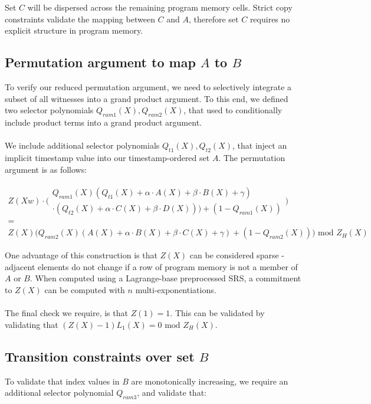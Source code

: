\documentclass[11pt]{article} %
\begin{document}
Set $C$ will be dispersed across the remaining program memory cells. Strict copy constraints validate the mapping between $C$ and $A$, therefore set $C$ requires no explicit structure in program memory.

\subsection{Permutation argument to map $A$ to $B$}

To verify our reduced permutation argument, we need to selectively integrate a subset of all witnesses into a grand product argument. To this end, we defined two selector polynomials $Q_{ram1}(X), Q_{ram2}(X)$, that used to conditionally include product terms into a grand product argument.
\\
\\
We include additional selector polynomials $Q_{t1}(X), Q_{t2}(X)$, that inject an implicit timestamp value into our timestamp-ordered set $A$. The permutation argument is as follows:

$$
\begin{array}{c}
Z(Xw) \cdot \bigg(\begin{array}{c} Q_{ram1}(X)(Q_{t1}(X) + \alpha \cdot A(X) + \beta \cdot B(X) + \gamma)
\\
\cdot (Q_{t2}(X) + \alpha \cdot C(X) + \beta \cdot D(X))) + (1 - Q_{ram1}(X)) \end{array}\bigg)
\\ = \\
Z(X)\bigg(Q_{ram2}(X)(A(X) + \alpha \cdot B(X) + \beta \cdot C(X) + \gamma) + (1 - Q_{ram2}(X))\bigg) \text{ mod } Z_H(X)
\end{array}
$$

One advantage of this construction is that $Z(X)$ can be considered sparse - adjacent elements do not change if a row of program memory is not a member of $A$ or $B$. When computed using a Lagrange-base preprocessed SRS, a commitment to $Z(X)$ can be computed with $n$ multi-exponentiations.
\\
\\
The final check we require, is that $Z(1) = 1$. This can be validated by validating that $(Z(X) - 1) L_1(X) = 0 \text{ mod } Z_H(X)$.

\subsection{Transition constraints over set $B$}

To validate that index values in $B$ are monotonically increasing, we require an additional selector polynomial $Q_{ram3}$, and validate that:
\end{document}

